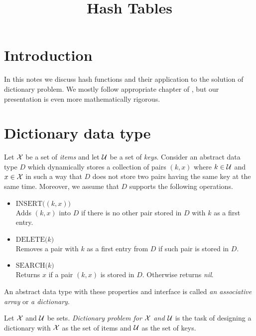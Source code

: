 


\title{Hash Tables}
\date{}
\maketitle

\section{Introduction}
\noindent
In this notes we discuss hash functions and their application to the solution of dictionary problem. We mostly follow appropriate chapter of \cite{CormenLeisersonRivestStein}, but our presentation is even more mathematically rigorous.

\section{Dictionary data type}

\begin{definition}
Let ${\mathcal X}$ be a set of \textit{items} and let ${\mathcal U}$ be a set of \textit{keys}. Consider an abstract data type $D$ which dynamically stores a collection of pairs $(k, x)$ where $k\in {\mathcal U}$ and $x\in {\mathcal X}$ in such a way that $D$ does not store two pairs having the same key at the same time. Moreover, we assume that $D$ supports the following operations.
\begin{itemize}
\item[] $\textrm{INSERT}\big((k,x)\big)$\\
Adds $(k,x)$ into $D$ if there is no other pair stored in $D$ with $k$ as a first entry.
\item[] $\textrm{DELETE}\big(k\big)$\\
Removes a pair with $k$ as a first entry from $D$ if such pair is stored in $D$.
\item[] $\textrm{SEARCH}\big(k\big)$\\
Returns $x$ if a pair $(k,x)$ is stored in $D$. Otherwise returns \textit{nil}. 
\end{itemize}
An abstract data type with these properties and interface is called \textit{an associative array} or \textit{a dictionary}.
\end{definition}

\begin{definition}
Let ${\mathcal X}$ and ${\mathcal U}$ be sets. \textit{Dictionary problem for ${\mathcal X}$ and ${\mathcal U}$} is the task of designing a dictionary with ${\mathcal X}$ as the set of items and ${\mathcal U}$ as the set of keys.
\end{definition}

